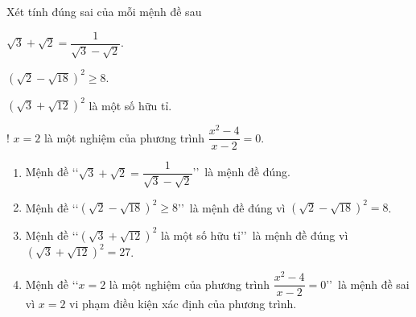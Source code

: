 \begin{bt}%
	Xét tính đúng sai của mỗi mệnh đề sau
	\begin{listEX}[3]
		\item $\sqrt{3}+\sqrt{2}=\dfrac{1}{\sqrt{3}-\sqrt{2}}$.
		\item $\left(\sqrt{2}-\sqrt{18}\right)^2\geqslant8$.
		\item $\left(\sqrt{3}+\sqrt{12}\right)^2$ là một số hữu tỉ.
		\item! $x=2$ là một nghiệm của phương trình $\dfrac{x^2-4}{x-2}=0$.
	\end{listEX}
	\loigiai
	{
		\begin{enumerate}
			\item Mệnh đề \lq\lq $\sqrt{3}+\sqrt{2}=\dfrac{1}{\sqrt{3}-\sqrt{2}}$\rq\rq\ là mệnh đề đúng.
			\item Mệnh đề \lq\lq $\left(\sqrt{2}-\sqrt{18}\right)^2\geqslant8$\rq\rq\ là mệnh đề đúng vì $\left(\sqrt{2}-\sqrt{18}\right)^2=8$.
			\item Mệnh đề \lq\lq $\left(\sqrt{3}+\sqrt{12}\right)^2$ là một số hữu tỉ\rq\rq\ là mệnh đề đúng vì $\left(\sqrt{3}+\sqrt{12}\right)^2=27$.
			\item Mệnh đề \lq\lq $x=2$ là một nghiệm của phương trình $\dfrac{x^2-4}{x-2}=0$\rq\rq\ là mệnh đề sai vì $x=2$ vi phạm điều kiện xác định của phương trình.
		\end{enumerate}
	}
\end{bt}

